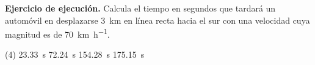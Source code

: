 \documentclass[12pt, letter]{exam}
\begin{document}
\begin{questions}
    \question \label{Ejercicio_02} \textbf{Ejercicio de ejecución. } Calcula el tiempo en segundos que tardará un automóvil en desplazarse \SI{3}{\kilo\meter} en línea recta hacia el sur con una velocidad cuya magnitud es de \SI{70}{\kilo\meter\per\hour}.
    \begin{tasks}(4)
        \task \SI{23.33}{\second}
        \task \SI{72.24}{\second}
        \task \SI{154.28}{\second}
        \task \SI{175.15}{\second}
    \end{tasks}

\end{questions}
\end{document}
